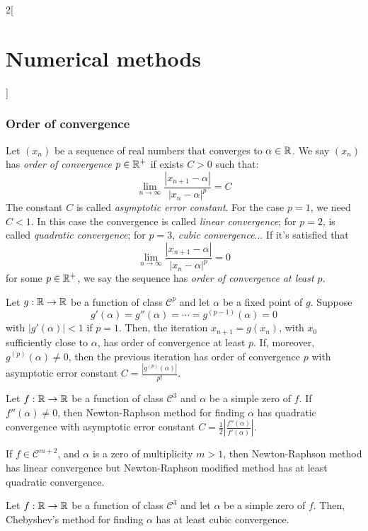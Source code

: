 \documentclass[../../../main.tex]{subfiles}
\begin{document}
\begin{multicols}{2}[\section{Numerical methods}]
  \subsubsection{Order of convergence}
  \begin{definition}
    Let $(x_n)$ be a sequence of real numbers that converges to $\alpha\in\mathbb{R}$. We say $(x_n)$ has \textit{order of convergence $p\in\mathbb{R}^+$} if exists $C>0$ such that: $$\lim_{n\to\infty}\frac{|x_{n+1}-\alpha|}{|x_n-\alpha|^p}=C$$ The constant $C$ is called \textit{asymptotic error constant}. For the case $p=1$, we need $C<1$. In this case the convergence is called \textit{linear convergence}; for $p=2$, is called \textit{quadratic convergence}; for $p=3$, \textit{cubic convergence}... If it's satisfied that $$\lim_{n\to\infty}\frac{|x_{n+1}-\alpha|}{|x_n-\alpha|^p}=0$$ for some $p\in\mathbb{R}^+$, we say the sequence has \textit{order of convergence at least $p$}.
  \end{definition}
  \begin{theorem}
    Let $g:\mathbb{R}\rightarrow\mathbb{R}$ be a function of class $\mathcal{C}^p$ and let $\alpha$ be a fixed point of $g$. Suppose $$g'(\alpha)=g''(\alpha)=\cdots=g^{(p-1)}(\alpha)=0$$ with $|g'(\alpha)|<1$ if $p=1$. Then, the iteration $x_{n+1}=g(x_n)$, with $x_0$ sufficiently close to $\alpha$, has order of convergence at least $p$. If, moreover, $g^{(p)}(\alpha)\ne0$, then the previous iteration has order of convergence $p$ with asymptotic error constant $C=\frac{|g^{(p)}(\alpha)|}{p!}$.
  \end{theorem}
  \begin{theorem}
    Let $f:\mathbb{R}\rightarrow\mathbb{R}$ be a function of class $\mathcal{C}^3$ and $\alpha$ be a simple zero of $f$. If $f''(\alpha)\ne0$, then Newton-Raphson method for finding $\alpha$ has quadratic convergence with asymptotic error constant $C=\frac{1}{2}\left|\frac{f''(\alpha)}{f'(\alpha)}\right|$.\par If $f\in\mathcal{C}^{m+2}$, and $\alpha$ is a zero of multiplicity $m>1$, then Newton-Raphson method has linear convergence but Newton-Raphson modified method has at least quadratic convergence.
  \end{theorem}
  \begin{theorem}
    Let $f:\mathbb{R}\rightarrow\mathbb{R}$ be a function of class $\mathcal{C}^3$ and let $\alpha$ be a simple zero of $f$. Then, Chebyshev's method for finding $\alpha$ has at least cubic convergence.
  \end{theorem}
  \begin{definition}

\end{definition}
\end{multicols}
\end{document}
